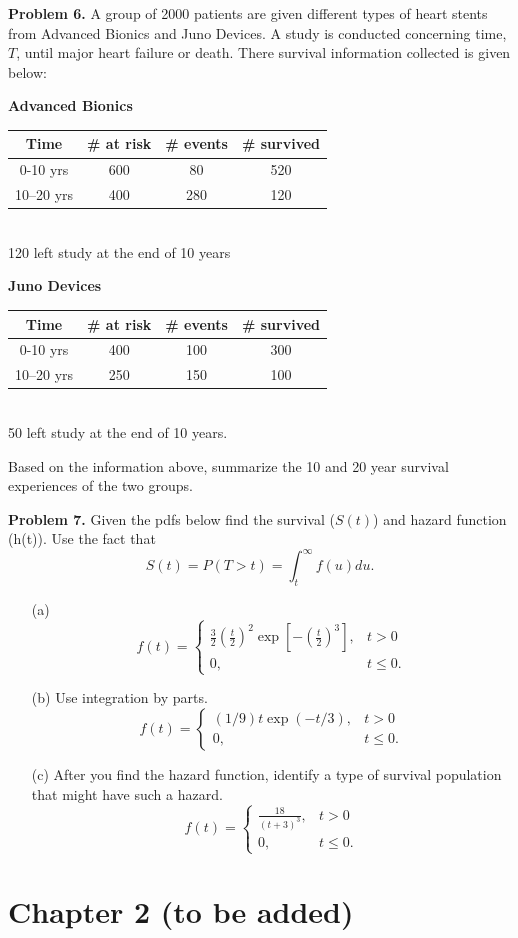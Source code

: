 \documentclass[12pt]{article}
\begin{document}
\textbf{Problem 6.}
A group of 2000 patients are given different types of heart stents from Advanced Bionics and Juno Devices. A study is conducted concerning time, $T$, until major heart failure or death. There survival information collected is given below:
\begin{center}
\textbf{Advanced Bionics}
\begin{tabular}{ c c c c }
 Time & \# at risk & \# events & \# survived \\ \hline
 0-10 yrs & 600 & 80 & 520 \\
 10–20 yrs &  400 & 280 & 120
\end{tabular} \\
120 left study at the end of 10 years
\end{center}
\begin{center}
\textbf{Juno Devices}
\begin{tabular}{ c c c c }
 Time & \# at risk & \# events & \# survived \\ \hline
 0-10 yrs & 400 & 100 & 300 \\
 10–20 yrs &  250 & 150 & 100
\end{tabular} \\
50 left study at the end of 10 years.
\end{center}
Based on the information above, summarize the 10 and 20 year survival experiences of the two groups.


\textbf{Problem 7.}
Given the pdfs below find the survival ($S(t)$) and hazard function (h(t)). Use the fact that
\[
S(t) = P(T>t) = \int_t^{\infty} f(u) du.
\]

\begin{itemize}
	\item[(a)]
	$$
	f(t) = \begin{cases} \frac{3}{2} (\frac{t}{2})^2 \exp[-(\frac{t}{2})^3], &t > 0 \\
		0, &t \leq 0.
		\end{cases}
	$$
	\item[(b)] Use integration by parts.
	$$
	f(t) = \begin{cases} (1/9)t\exp(-t/3), &t > 0 \\
		0, &t \leq 0.
		\end{cases}
    $$
    \item[(c)] After you find the hazard function, identify a type of survival population that might have such a hazard.
    $$
	f(t) = \begin{cases} \frac{18}{(t+3)^3}, &t > 0 \\
		0, &t \leq 0.
		\end{cases}
    $$
\end{itemize}

\section{Chapter 2 (to be added)}
\end{document}
